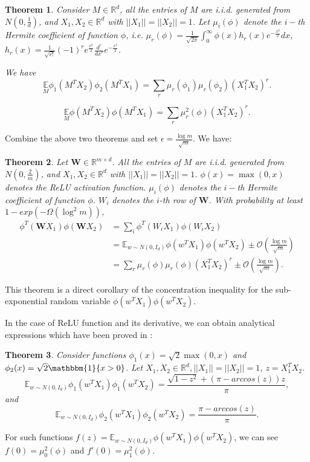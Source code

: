 \documentclass{article}
\newcommand{\cO}{\mathcal{O}}
\newtheorem{theo}{\textbf{Theorem}}
\begin{document}
\begin{theo}\label{nei}
Consider $M\in \mathbb{R}^d$, all  the entries of $M$ are i.i.d. generated from $N(0,\frac{1}{d})$, and $X_1,X_2\in\mathbb{R}^d$ with $||X_1||=||X_2||=1$. Let $\mu_i(\phi)$ denote the $i-$th Hermite coefficient of function $\phi$, i.e.
$\mu_r(\phi)=\frac{1}{\sqrt{2\pi}}\int_0^\infty \phi(x)h_r(x)e^{-\frac{x^2}{2}}dx$, $h_r(x)=\frac{1}{\sqrt{r!}}(-1)^re^{\frac{x^2}{2}}\frac{d^r}{dx^r}e^{-\frac{x^2}{2}}.$

We have
\begin{equation}
\underset{M}{\mathbb{E}} \phi_1(M^TX_2)\phi_2(M^TX_1)=\sum_r \mu_r(\phi_1)\mu_r(\phi_2)(X_1^TX_2)^{r}.
\end{equation}

\begin{equation}
\underset{M}{\mathbb{E}} \phi(M^TX_2)\phi(M^TX_1)=\sum_r \mu^2_r(\phi)(X_1^TX_2)^{r}.
\end{equation}
\end{theo}

Combine the above two theorems and set $\epsilon=\frac{\log m}{\sqrt{m}}$. We have:
\begin{theo}\label{fj}
Let $\bm{W}\in \mathbb{R}^{m\times d}$. All  the entries of $M$ are i.i.d. generated from $N(0,\frac{2}{m})$, and $X_1,X_2\in\mathbb{R}^d$ with $||X_1||=||X_2||=1$. $\phi(x)=\max(0,x)$ denotes the ReLU activation function. $\mu_i(\phi)$ denotes the $i-$th Hermite coefficient of function $\phi$. $W_i$ denotes the $i$-th row of $\bm{W}$.
With probability at least $1-exp(-\Omega(\log^2m ))$,
\begin{equation}
\begin{aligned}
\phi^T(\bm{W}X_1)\phi(\bm{W}X_2)&=\sum_i \phi^T(W_iX_1)\phi(W_iX_2)\\
&=\mathbb{E}_{w\sim N(0, I_d)}\phi(w^TX_1)\phi(w^TX_2)\pm \cO(\frac{\log m}{\sqrt{m}})\\
&=\sum_r \mu_r(\phi)\mu_r(\phi)(X_1^TX_2)^{r} \pm \cO(\frac{\log m}{\sqrt{m}}).
\end{aligned}
\end{equation}
\end{theo}
This theorem is a direct corollary of the concentration inequality for the sub-exponential random variable $\phi(w^TX_1)\phi(w^TX_2)$.

In the case of ReLU function and its derivative, we can obtain analytical expressions which have been proved in \cite{NIPS2016_abea47ba,huang2020deep}:
\begin{theo}\label{fj2}
Consider functions $\phi_1(x)=\sqrt{2}\max(0,x)$ and $\phi_2(x)=\sqrt{2}\mathbbm{1}\{x>0\}$. Let $X_1, X_2\in \mathbb{R}^d, ||X_1||= ||X_2||=1$, $z=X_1^TX_2$.
\begin{equation}
\mathbb{E}_{w\sim N(0, I_d)}\phi_1(w^TX_1)\phi_1(w^TX_2)=\frac{\sqrt{1-z^2}+(\pi-arccos(z))z}{\pi},
\end{equation}
and
\begin{equation}
\mathbb{E}_{w\sim N(0, I_d)}\phi_2(w^TX_1)\phi_2(w^TX_2)=\frac{\pi-arccos(z)}{\pi}.
\end{equation}
\end{theo}
For such functions $f(z)=\mathbb{E}_{w\sim N(0, I_d)}\phi(w^TX_1)\phi(w^TX_2)$, we can see $f(0)=\mu^2_0(\phi)$ and $f'(0)=\mu^2_1(\phi)$.
\end{document}
